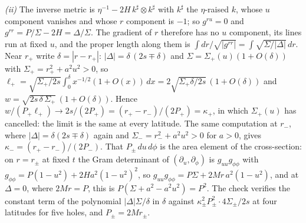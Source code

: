 \emph{(ii)} The inverse metric is $\eta^{-1} - 2H\,k^\sharp\otimes k^\sharp$ with $k^\sharp$ the $\eta$-raised $k$, whose $u$ component vanishes and whose $r$ component is $-1$; so $g^{ru} = 0$ and $g^{rr} = P/\Sigma - 2H = \Delta/\Sigma$. The gradient of $r$ therefore has no $u$ component, its lines run at fixed $u$, and the proper length along them is $\int dr/\sqrt{|g^{rr}|} = \int\sqrt{\Sigma/|\Delta|}\,dr$. Near $r_+$ write $\delta = |r - r_+|$: $|\Delta| = \delta\,(2s \mp \delta)$ and $\Sigma = \Sigma_+(u)(1 + O(\delta))$ with $\Sigma_+ = r_+^2 + a^2u^2 > 0$, so $\ell_+ = \sqrt{\Sigma_+/2s}\int_0^{\delta}x^{-1/2}(1 + O(x))\,dx = 2\sqrt{\Sigma_+\delta/2s}\,(1 + O(\delta))$ and $w = \sqrt{2s\,\delta\,\Sigma_+}\,(1 + O(\delta))$. Hence $w/(P_+\ell_+) \to 2s/(2P_+) = (r_+ - r_-)/(2P_+) = \kappa_+$, in which $\Sigma_+(u)$ has cancelled: the limit is the same at every latitude. The same computation at $r_-$, where $|\Delta| = \delta(2s \mp \delta)$ again and $\Sigma_- = r_-^2 + a^2u^2 > 0$ for $a > 0$, gives $\kappa_- = (r_+ - r_-)/(2P_-)$. That $P_\pm\,du\,d\phi$ is the area element of the cross-section: on $r = r_\pm$ at fixed $t$ the Gram determinant of $(\partial_u, \partial_\phi)$ is $g_{uu}g_{\phi\phi}$ with $g_{\phi\phi} = P(1-u^2) + 2Ha^2(1-u^2)^2$, so $g_{uu}g_{\phi\phi} = P\Sigma + 2Mr\,a^2(1-u^2)$, and at $\Delta = 0$, where $2Mr = P$, this is $P(\Sigma + a^2 - a^2u^2) = P^2$. The check verifies the constant term of the polynomial $|\Delta|\Sigma/\delta$ in $\delta$ against $\kappa_\pm^2P_\pm^2\cdot 4\Sigma_\pm/2s$ at four latitudes for five holes, and $P_\pm = 2Mr_\pm$.

